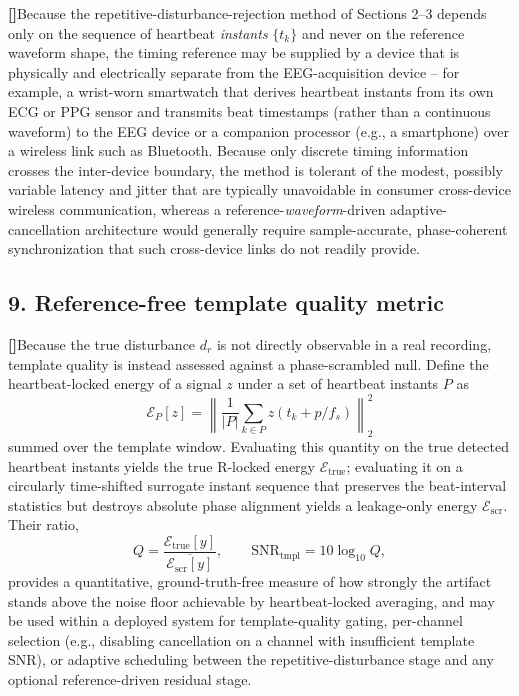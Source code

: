 \documentclass[12pt]{article}
\newcounter{para}
\newcommand{\parnum}{\stepcounter{para}\noindent\textbf{[\thepara]}\quad}
\begin{document}
\parnum Because the repetitive-disturbance-rejection method of Sections 2--3 depends only on the sequence of heartbeat \emph{instants} $\{t_k\}$ and never on the reference waveform shape, the timing reference may be supplied by a device that is physically and electrically separate from the EEG-acquisition device -- for example, a wrist-worn smartwatch that derives heartbeat instants from its own ECG or PPG sensor and transmits beat timestamps (rather than a continuous waveform) to the EEG device or a companion processor (e.g., a smartphone) over a wireless link such as Bluetooth. Because only discrete timing information crosses the inter-device boundary, the method is tolerant of the modest, possibly variable latency and jitter that are typically unavoidable in consumer cross-device wireless communication, whereas a reference-\emph{waveform}-driven adaptive-cancellation architecture would generally require sample-accurate, phase-coherent synchronization that such cross-device links do not readily provide.

\subsection*{9. Reference-free template quality metric}

\parnum Because the true disturbance $d_r$ is not directly observable in a real recording, template quality is instead assessed against a phase-scrambled null. Define the heartbeat-locked energy of a signal $z$ under a set of heartbeat instants $P$ as
\begin{equation}
\mathcal{E}_P[z] = \left\| \frac{1}{|P|}\sum_{k\in P} z(t_k + p/f_s) \right\|_2^2
\end{equation}
summed over the template window. Evaluating this quantity on the true detected heartbeat instants yields the true R-locked energy $\mathcal{E}_{\mathrm{true}}$; evaluating it on a circularly time-shifted surrogate instant sequence that preserves the beat-interval statistics but destroys absolute phase alignment yields a leakage-only energy $\mathcal{E}_{\mathrm{scr}}$. Their ratio,
\begin{equation}
Q = \frac{\mathcal{E}_{\mathrm{true}}[y]}{\overline{\mathcal{E}_{\mathrm{scr}}[y]}}, \qquad
\mathrm{SNR}_{\mathrm{tmpl}} = 10\log_{10}Q,
\end{equation}
provides a quantitative, ground-truth-free measure of how strongly the artifact stands above the noise floor achievable by heartbeat-locked averaging, and may be used within a deployed system for template-quality gating, per-channel selection (e.g., disabling cancellation on a channel with insufficient template SNR), or adaptive scheduling between the repetitive-disturbance stage and any optional reference-driven residual stage.
\end{document}
